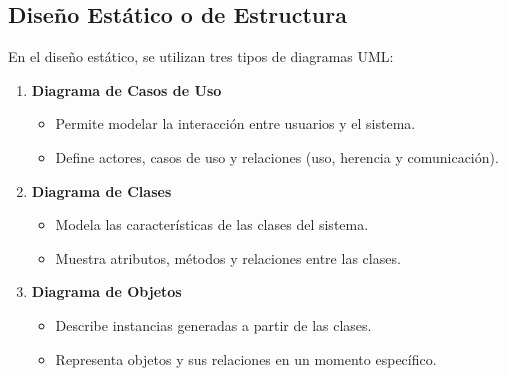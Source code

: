 \documentclass[11pt, twocolumn]{article}
\begin{document}
  \subsection*{Diseño Estático o de Estructura}
  En el diseño estático, se utilizan tres tipos de diagramas UML:
  \begin{enumerate}
    \item \textbf{Diagrama de Casos de Uso}
    \begin{itemize}
      \item Permite modelar la interacción entre usuarios y el sistema.
      \item Define actores, casos de uso y relaciones (uso, herencia y comunicación).
    \end{itemize}

    \item \textbf{Diagrama de Clases}
    \begin{itemize}
      \item Modela las características de las clases del sistema.
      \item Muestra atributos, métodos y relaciones entre las clases.
    \end{itemize}

    \item \textbf{Diagrama de Objetos}
    \begin{itemize}
      \item Describe instancias generadas a partir de las clases.
      \item Representa objetos y sus relaciones en un momento específico.
    \end{itemize}
  \end{enumerate}
\end{document}
